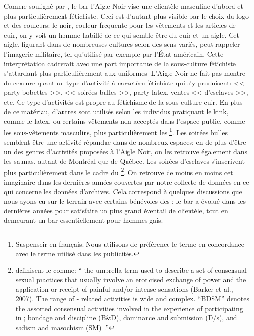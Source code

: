 Comme souligné par \citet{Giraud2013a}, le bar l'Aigle Noir vise une clientèle masculine d'abord et plus particulièrement fétichiste. 
Ceci est d'autant plus visible par le choix du logo et des couleurs: le noir, couleur fréquente pour les vêtements et les articles de cuir, on y voit un homme habillé de ce qui semble être du cuir et un aigle. 
Cet aigle, figurant dans de nombreuses cultures selon des sens variés, peut rappeler l'imagerie militaire, tel qu'utilisé par exemple par l'État américain. 
Cette interprétation cadrerait avec une part importante de la sous-culture fétichiste s'attardant plus particulièrement aux uniformes. 
L'Aigle Noir ne fait pas montre de censure quant au type d'activité à caractère fétichiste qui s'y produisent: << party bobettes >>, << soirées bulles >>, party latex, ventes << d'esclaves >>, etc. 
Ce type d'activités est propre au fétichisme de la sous-culture cuir.
En plus de ce matériau, d'autres sont utilisés selon les individus pratiquant le kink, comme le latex, ou certains vêtements non acceptés dans l'espace public, comme les sous-vêtements masculins, plus particulièrement les \footnote{Suspensoir en français. Nous utilisons de préférence le terme  en concordance avec le terme utilisé dans les publicités. }.
Les soirées bulles semblent être une activité répandue dans de nombreux espaces: en de plus d'être un des genres d'activités proposées à l'Aigle Noir, on les retrouve également dans les saunas, autant de Montréal que de Québec. 
Les soirées d'esclaves s'inscrivent plus particulièrement dans le cadre du \bdsm{}\footnote{\citeauthor{ Turley2015} définisent le \bdsm{} comme: \foreignquote{ english}{\textelp{} the umbrella term used to describe a set of consensual sexual practices that usually involve an eroticised exchange of power and the application or receipt of painful and/or intense sensations (Barker et al., 2007). 
The range of \bdsm{}- related activities is wide and complex. 
“BDSM” denotes the assorted consensual activities involved in the experience of participating in \bdsm{}; bondage and discipline (B\&D), dominance and submission (D/s), and sadism and masochism (SM)~\citeyearpar[24]{Turley2015}.}}. 
On retrouve de moins en moins cet imaginaire dans les dernières années couvertes par notre collecte de données en ce qui concerne les données d'archives. 
Cela correspond à quelques discussions que nous ayons eu sur le terrain avec certains bénévoles des \agq{}: le bar a évolué dans les dernières années pour satisfaire un plus grand éventail de clientèle, tout en demeurant un bar essentiellement pour hommes gais.

